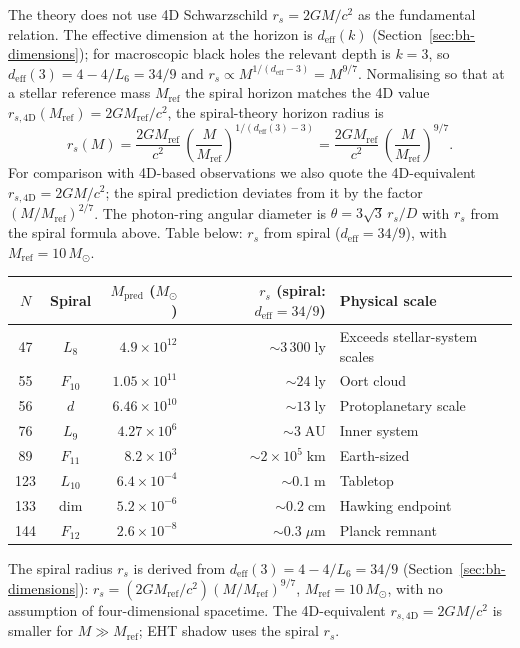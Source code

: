 \documentclass[12pt,a4paper]{article}
\begin{document}
The theory does not use 4D Schwarzschild $r_s = 2GM/c^2$ as the fundamental relation. The effective dimension at the horizon is $d_{\mathrm{eff}}(k)$ (Section~\ref{sec:bh-dimensions}); for macroscopic black holes the relevant depth is $k = 3$, so $d_{\mathrm{eff}}(3) = 4 - 4/L_6 = 34/9$ and $r_s \propto M^{1/(d_{\mathrm{eff}}-3)} = M^{9/7}$. Normalising so that at a stellar reference mass $M_{\mathrm{ref}}$ the spiral horizon matches the 4D value $r_{s,4\mathrm{D}}(M_{\mathrm{ref}}) = 2GM_{\mathrm{ref}}/c^2$, the spiral-theory horizon radius is
\begin{equation}
r_s(M) = \frac{2G M_{\mathrm{ref}}}{c^2}\,\left(\frac{M}{M_{\mathrm{ref}}}\right)^{1/(d_{\mathrm{eff}}(3)-3)} = \frac{2GM_{\mathrm{ref}}}{c^2}\,\left(\frac{M}{M_{\mathrm{ref}}}\right)^{9/7}.
\end{equation}
For comparison with 4D-based observations we also quote the 4D-equivalent $r_{s,4\mathrm{D}} = 2GM/c^2$; the spiral prediction deviates from it by the factor $(M/M_{\mathrm{ref}})^{2/7}$. The photon-ring angular diameter is $\theta = 3\sqrt{3}\,r_s/D$ with $r_s$ from the spiral formula above. Table below: $r_s$ from spiral ($d_{\mathrm{eff}} = 34/9$), with $M_{\mathrm{ref}} = 10\,M_\odot$.

\begin{center}\small
\begin{tabular}{cc rr p{3.2cm}}
\toprule
$N$ & Spiral & $M_{\mathrm{pred}}$ ($M_\odot$) & $r_s$ (spiral: $d_{\mathrm{eff}}{=}34/9$) & Physical scale \\
\midrule
47 & $L_8$ & $4.9\times 10^{12}$ & $\sim 3\,300\;\mathrm{ly}$ & Exceeds stellar-system scales \\
55 & $F_{10}$ & $1.05\times 10^{11}$ & $\sim 24\;\mathrm{ly}$ & Oort cloud \\
56 & $d$ & $6.46\times 10^{10}$ & $\sim 13\;\mathrm{ly}$ & Protoplanetary scale \\
76 & $L_9$ & $4.27\times 10^{6}$ & $\sim 3\;\mathrm{AU}$ & Inner system \\
89 & $F_{11}$ & $8.2\times 10^{3}$ & $\sim 2\times 10^{5}\;\mathrm{km}$ & Earth-sized \\
123 & $L_{10}$ & $6.4\times 10^{-4}$ & $\sim 0.1\;\mathrm{m}$ & Tabletop \\
133 & $\dim$ & $5.2\times 10^{-6}$ & $\sim 0.2\;\mathrm{cm}$ & Hawking endpoint \\
144 & $F_{12}$ & $2.6\times 10^{-8}$ & $\sim 0.3\;\mu\mathrm{m}$ & Planck remnant \\
\bottomrule
\end{tabular}
\end{center}
\noindent The spiral radius $r_s$ is derived from $d_{\mathrm{eff}}(3)=4-4/L_6=34/9$ (Section~\ref{sec:bh-dimensions}): $r_s = (2GM_{\mathrm{ref}}/c^2)(M/M_{\mathrm{ref}})^{9/7}$, $M_{\mathrm{ref}}=10\,M_\odot$, with no assumption of four-dimensional spacetime. The 4D-equivalent $r_{s,4\mathrm{D}}=2GM/c^2$ is smaller for $M \gg M_{\mathrm{ref}}$; EHT shadow uses the spiral $r_s$.
\end{document}
